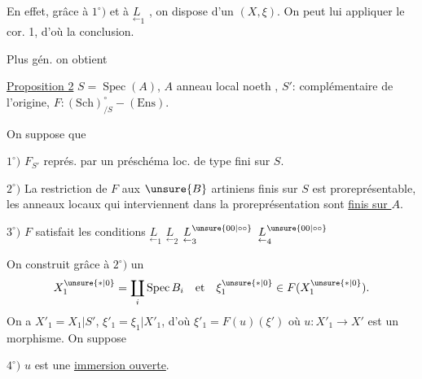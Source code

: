 En effet, grâce à $1^\circ)$ et à $\underset{\leftarrow}{L}_1$ , on dispose d'un $(X,\xi)$. On peut lui appliquer le cor. 1, d'où la conclusion.

Plus gén. on obtient

\uline{Proposition 2} $S=\operatorname{Spec}(A)$, $A$ anneau local noeth , $S'$: complémentaire de l'origine,  $F:(\mathrm{Sch})_{/S}^{\circ}\mathbin{-}(\mathrm{Ens})$.

On suppose que

$1^\circ)$ $F_{S'}$ représ. par un  préschéma  loc. de type fini sur $S$.

$2^\circ)$ La restriction de $F$ aux $\unsure{B}$ artiniens finis sur $S$ est proreprésentable, les anneaux locaux qui interviennent dans la proreprésentation sont   \uline{finis sur $A$}.

$3^\circ)$ $F$ satisfait les conditions $\underset{\leftarrow}{L}_1$ $\underset{\leftarrow}{L}_2$ $\underset{\leftarrow}{L}_3^{\unsure{00|\circ\circ}}$ $\underset{\leftarrow}{L}_4^{\unsure{00|\circ\circ}}$

On construit grâce à $2^\circ)$ un
\[
X_1^{\unsure{*|0}}=\coprod_i\operatorname{Spec}B_i\quad\text{et}\quad\xi_1^{\unsure{*|0}}\in F(X_1^{\unsure{*|0}}).
\]
On a $X'_1=X_1|S'$, $\xi'_1=\xi_1|X'_1$, d'où $\xi'_1=F(u)(\xi')$ où $u:X'_1\to X'$ est un morphisme. On suppose

$4^\circ)$ $u$ est une \uline{immersion ouverte}.

